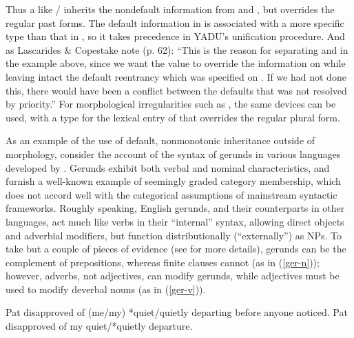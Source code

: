 \documentclass[output=paper]{langsci/langscibook}
\begin{document}
Thus a  like / inherits the nondefault information from  and , but overrides the regular past forms.
The default information in  is associated with a more specific type than that in , so it takes precedence in YADU's unification procedure.
And as Lascarides \& Copestake note (p. 62): ``This is the reason for separating  and  in the example above, since we want the  value to override the  information on  while leaving intact the default reentrancy which was specified on .  If we had not done this, there would have been a conflict between the defaults that was not resolved by priority.'' For morphological irregularities such as , the same devices can be used, with a type for the lexical entry of  that overrides the regular plural form.

As an example of the use of default, nonmonotonic inheritance outside of morphology, consider the account of the syntax of gerunds in various languages developed by \citet{Malouf2000b}. 
Gerunds exhibit both verbal and nominal characteristics, and furnish a well-known example of seemingly graded category membership, which does not accord well with the categorical assumptions of mainstream syntactic frameworks.
Roughly speaking, English gerunds, and their counterparts in other languages, act much like verbs in their ``internal'' syntax, allowing direct objects and adverbial modifiers, but function distributionally (``externally'') as NPs.
To take but a couple of pieces of evidence (see \citet[27-33]{Malouf2000b} for more details), 
gerunds can be the complement of prepositions, whereas finite clauses cannot (as in (\ref{ger-n})); however, adverbs, not adjectives, can modify gerunds, while adjectives must be used to modify deverbal nouns (as in (\ref{ger-v})).


\begin{exe}
\ex\label{ger-n}
\begin{xlist}
\end{xlist}	
\ex\label{ger-v}
\begin{xlist}
	\ex\label{ger-v-a}
	Pat disapproved of (me/my) *quiet/quietly departing before anyone noticed.
	\ex\label{ger-v-b}
	Pat disapproved of my quiet/*quietly departure.
\end{xlist}
\end{exe}
\end{document}
